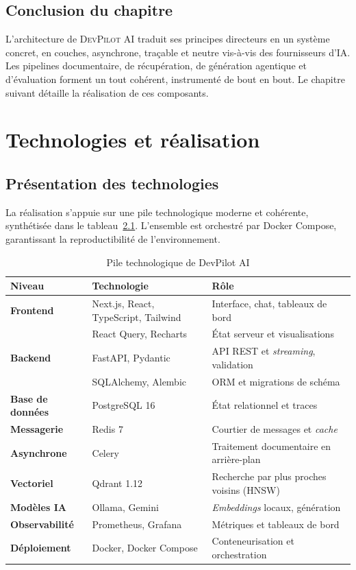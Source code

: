 \documentclass[12pt,a4paper,oneside]{report}
\newcommand{\devpilot}{\textsc{DevPilot AI}}
\begin{document}
\section{Conclusion du chapitre}
L'architecture de \devpilot{} traduit ses principes directeurs en un système
concret, en couches, asynchrone, traçable et neutre vis-à-vis des fournisseurs
d'IA. Les pipelines documentaire, de récupération, de génération agentique et
d'évaluation forment un tout cohérent, instrumenté de bout en bout. Le chapitre
suivant détaille la réalisation de ces composants.

\chapter{Technologies et réalisation}
\label{chap:real}

\section{Présentation des technologies}
La réalisation s'appuie sur une pile technologique moderne et cohérente,
synthétisée dans le tableau~\ref{tab:stack}. L'ensemble est orchestré par Docker
Compose, garantissant la reproductibilité de l'environnement.

\begin{table}[H]
\centering
\caption{Pile technologique de DevPilot AI}
\label{tab:stack}
\small
\begin{tabularx}{\textwidth}{@{}>{\bfseries}l l X@{}}
\toprule
Niveau & Technologie & Rôle \\
\midrule
Frontend     & Next.js, React, TypeScript, Tailwind & Interface, chat, tableaux de bord \\
             & React Query, Recharts & État serveur et visualisations \\
Backend      & FastAPI, Pydantic & API REST et \emph{streaming}, validation \\
             & SQLAlchemy, Alembic & ORM et migrations de schéma \\
Base de données & PostgreSQL 16 & État relationnel et traces \\
Messagerie   & Redis 7 & Courtier de messages et \emph{cache} \\
Asynchrone   & Celery & Traitement documentaire en arrière-plan \\
Vectoriel    & Qdrant 1.12 & Recherche par plus proches voisins (HNSW) \\
Modèles IA   & Ollama, Gemini & \emph{Embeddings} locaux, génération \\
Observabilité& Prometheus, Grafana & Métriques et tableaux de bord \\
Déploiement  & Docker, Docker Compose & Conteneurisation et orchestration \\
\bottomrule
\end{tabularx}
\end{table}
\end{document}
